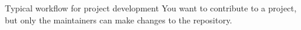 \documentclass[svgnames]{beamer}
\begin{document}
\begin{frame}{Typical workflow for project development}
  You want to contribute to a project, but only the maintainers
	can make changes to the repository.

 \vspace{0.3truecm}
\end{frame}
\end{document}
